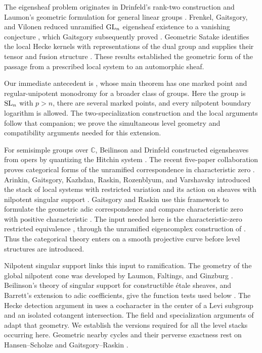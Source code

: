 The eigensheaf problem originates in Drinfeld's rank-two construction and
Laumon's geometric formulation for general linear groups
\cite{Drinfeld,Laumon}. Frenkel, Gaitsgory, and Vilonen reduced unramified
$\operatorname{GL}_n$ eigensheaf existence to a vanishing conjecture \cite{FGV}, which
Gaitsgory subsequently proved \cite{GaitsgoryVanishing}. Geometric Satake
identifies the local Hecke kernels with representations of the dual group
and supplies their tensor and fusion structure \cite{MV}. These results
established the geometric form of the passage from a prescribed local
system to an automorphic sheaf.

Our immediate antecedent is \cite[Theorem~1.1]{CT}, whose main theorem
has one marked point and regular-unipotent monodromy for a broader class
of groups. Here the group is $\operatorname{SL}_n$ with $p>n$, there are several marked
points, and every nilpotent boundary logarithm is allowed. The
two-specialization construction and the local arguments follow that
companion; we prove the simultaneous level geometry and compatibility
arguments needed for this extension.

For semisimple groups over $\mathbb C$, Beilinson and Drinfeld constructed
eigensheaves from opers by quantizing the Hitchin system \cite[\S0.2]{BD}.
The recent five-paper collaboration proves categorical forms of the
unramified correspondence in characteristic zero \cite{GLCI,GLCV}.
Arinkin, Gaitsgory, Kazhdan, Raskin, Rozenblyum, and Varshavsky introduced
the stack of local systems with restricted variation and its action on
sheaves with nilpotent singular support \cite{AGKRRV}.
Gaitsgory and Raskin use this framework to formulate the geometric adic
correspondence and compare characteristic zero with positive characteristic
\cite{GR}. The input needed here is the characteristic-zero restricted
equivalence \cite[Main Theorem~1.3.9(ii)]{GR}, through the unramified
eigencomplex construction of \cite[Lemma~8.1]{CT}. Thus the categorical
theory enters on a smooth projective curve before level structures are
introduced.

Nilpotent singular support links this input to ramification. The geometry
of the global nilpotent cone was developed by Laumon, Faltings, and Ginzburg
\cite{LaumonNilpotent,Faltings,GinzburgNilpotent}. Beilinson's theory of
singular support for constructible \'etale sheaves, and Barrett's extension
to adic coefficients, give the function tests used below
\cite{Beilinson,Barrett}. The Hecke detection argument in
\cite[\S\S20.5--20.8, Appendix~H]{AGKRRV} uses a cocharacter in the center
of a Levi subgroup and an isolated cotangent intersection. The field and
specialization arguments of \cite[\S\S3--4]{CT} adapt that geometry. We establish
the versions required for all the level stacks occurring here.
Geometric nearby cycles and their perverse exactness rest on
Hansen--Scholze and Gaitsgory--Raskin \cite{HS,GR}.

